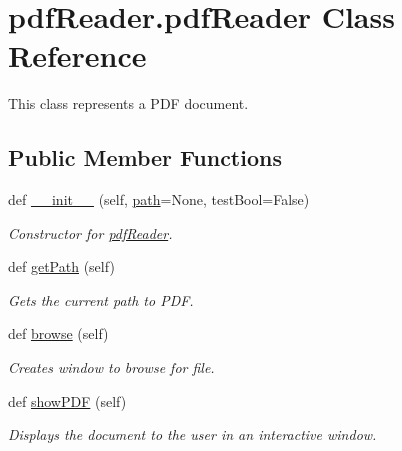 \hypertarget{classpdfReader_1_1pdfReader}{}\section{pdf\+Reader.\+pdf\+Reader Class Reference}
\label{classpdfReader_1_1pdfReader}


This class represents a P\+DF document.  


\subsection*{Public Member Functions}
\begin{DoxyCompactItemize}
\item 
def \hyperlink{classpdfReader_1_1pdfReader_af3a16920a7c67b75306a8c835779b883}{\+\_\+\+\_\+init\+\_\+\+\_\+} (self, \hyperlink{classpdfReader_1_1pdfReader_a37a7c7f6730fcc766decf0ab476d3549}{path}=None, test\+Bool=False)
\begin{DoxyCompactList}\small\item\em Constructor for \hyperlink{classpdfReader_1_1pdfReader}{pdf\+Reader}. \end{DoxyCompactList}\item 
def \hyperlink{classpdfReader_1_1pdfReader_a9d2b2ef52976b93dfac3a5aecf0bebb8}{get\+Path} (self)
\begin{DoxyCompactList}\small\item\em Gets the current path to P\+DF. \end{DoxyCompactList}\item 
\mbox{\label{classpdfReader_1_1pdfReader_abf8c42f08d79965e0228a9bef7b4bf7c}} 
def \hyperlink{classpdfReader_1_1pdfReader_abf8c42f08d79965e0228a9bef7b4bf7c}{browse} (self)
\begin{DoxyCompactList}\small\item\em Creates window to browse for file. \end{DoxyCompactList}\item 
\mbox{\label{classpdfReader_1_1pdfReader_aeb362a651aaee664ffbb1477d54ffa94}} 
def \hyperlink{classpdfReader_1_1pdfReader_aeb362a651aaee664ffbb1477d54ffa94}{show\+P\+DF} (self)
\begin{DoxyCompactList}\small\item\em Displays the document to the user in an interactive window. \end{DoxyCompactList}\item 

\end{DoxyCompactItemize}
